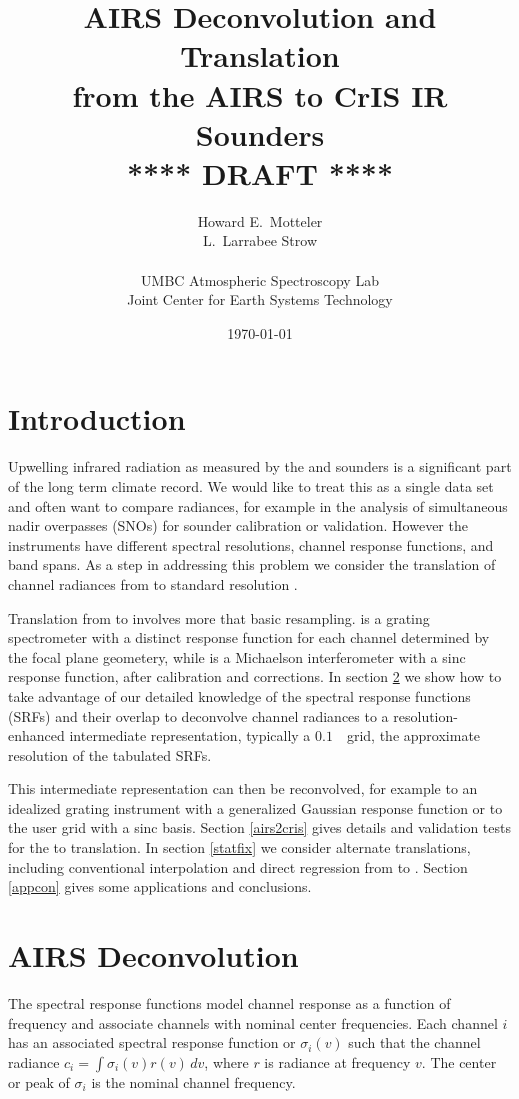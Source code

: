 \documentclass[11pt]{article}
\title{AIRS Deconvolution and Translation \\
  from the AIRS to CrIS IR Sounders \\
  \vspace{3mm}
  {****} DRAFT {****}\\
}
\author{Howard E.~Motteler \\
  L.~Larrabee Strow \\
  \\
  UMBC Atmospheric Spectroscopy Lab \\
  Joint Center for Earth Systems Technology \\
}
\date{\today}
\begin{document}
\maketitle

\section{Introduction}

Upwelling infrared radiation as measured by the {\airs} \cite{airs1}
and {\cris} \cite{cris1,cris2} sounders is a significant part of the
long term climate record.  We would like to treat this as a single
data set and often want to compare radiances, for example in the
analysis of simultaneous nadir overpasses (SNOs) for sounder
calibration or validation.  However the instruments have different
spectral resolutions, channel response functions, and band spans.
As a step in addressing this problem we consider the translation of
channel radiances from {\airs} to standard resolution {\cris}.

Translation from {\airs} to {\cris} involves more that basic
resampling.  {\airs} is a grating spectrometer with a distinct
response function for each channel determined by the focal plane
geometery, while {\cris} is a Michaelson interferometer with a sinc
response function, after calibration and corrections.  In section
\ref{decon} we show how to take advantage of our detailed knowledge
of the {\airs} spectral response functions (SRFs) and their overlap
to deconvolve channel radiances to a resolution-enhanced
intermediate representation, typically a $0.1$~\wn\ grid, the
approximate resolution of the tabulated {\airs} SRFs.  

This intermediate representation can then be reconvolved, for
example to an idealized grating instrument with a generalized
Gaussian response function or to the {\cris} user grid with a sinc
basis.  Section \ref{airs2cris} gives details and validation tests
for the {\airs} to {\cris} translation.  In section \ref{statfix} 
we consider alternate translations, including conventional
interpolation and direct regression from {\airs} to {\cris}.
Section \ref{appcon} gives some applications and conclusions.

\FloatBarrier
\section{AIRS Deconvolution}
\label{decon}

The {\airs} spectral response functions model channel response as a
function of frequency and associate channels with nominal center
frequencies.  Each {\airs} channel $i$ has an associated spectral
response function or {\srf} $\sigma_i(v)$ such that the channel
radiance $c_i = \int \sigma_i(v)r(v)\,dv$, where $r$ is radiance at
frequency $v$.  The center or peak of $\sigma_i$ is the nominal
channel frequency.
\end{document}
